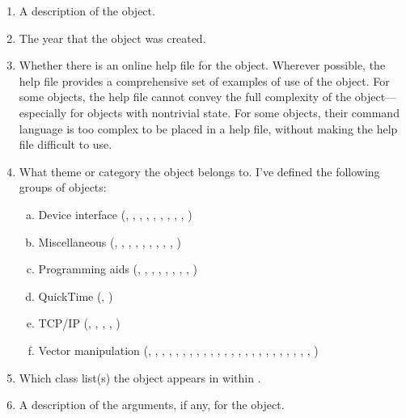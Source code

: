 \begin{enumerate}[  1)]
\item A description of the object.
\item The year that the object was created.
\item Whether there is an online help file for the object.
Wherever possible, the help file provides a comprehensive set of examples of use of the object.
For some objects, the help file cannot convey the full complexity of the object---especially for objects with nontrivial state.
For some objects, their command language is too complex to be placed in a help file, without making the help file difficult to use.
\item What theme or category the object belongs to.
I've defined the following groups of objects:
  \begin{enumerate}[a)]
  \item Device interface (, , , , , ,
    , , , )
  \item Miscellaneous (, , , , ,
    , , , , )
  \item Programming aids (, , , , ,
    , , , )
  \item QuickTime\texttrademark{} (, )
  \item TCP/IP (, , , , )
  \item Vector manipulation (, , , , ,
    , , , , , , ,
    , , , , , ,
    , , , , , , )
  \end{enumerate}
\item Which class list(s) the object appears in within \MaxName.
\item A description of the arguments, if any, for the object.

\end{enumerate}
